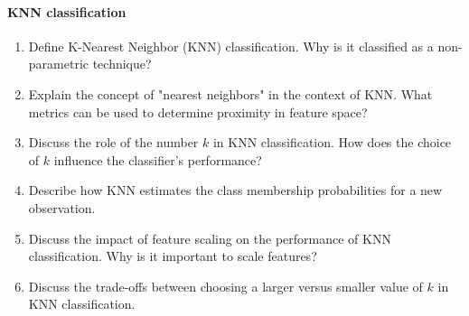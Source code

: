 \paragraph*{KNN classification}
\begin{enumerate}
  \item Define K-Nearest Neighbor (KNN) classification. Why is it classified as a non-parametric technique?
  \item Explain the concept of "nearest neighbors" in the context of KNN. What metrics can be used to determine proximity in feature space?
  \item Discuss the role of the number $k$ in KNN classification. How does the choice of $k$ influence the classifier's performance?
  \item Describe how KNN estimates the class membership probabilities for a new observation.
  \item Discuss the impact of feature scaling on the performance of KNN classification. Why is it important to scale features?
  \item Discuss the trade-offs between choosing a larger versus smaller value of $k$ in KNN classification.
\end{enumerate}
